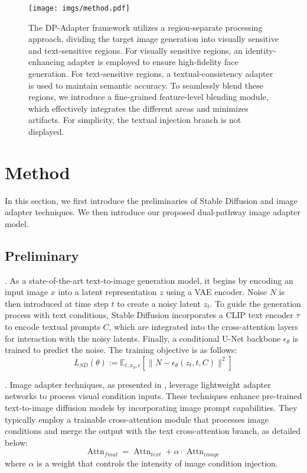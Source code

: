 \begin{figure*}[t]
    \centering
    \texttt{[image: imgs/method.pdf]}
    \caption{The DP-Adapter framework utilizes a region-separate processing approach, dividing the target image generation into visually sensitive and text-sensitive regions. For visually sensitive regions, an identity-enhancing adapter is employed to ensure high-fidelity face generation. For text-sensitive regions, a textual-consistency adapter is used to maintain semantic accuracy. To seamlessly blend these regions, we introduce a fine-grained feature-level blending module, which effectively integrates the different areas and minimizes artifacts.
    For simplicity, the textual injection branch is not displayed.}
    \label{fig:method_framework}
\end{figure*}


\section{Method}


In this section, we first introduce the preliminaries of Stable Diffusion \cite{rombach2022high} and image adapter techniques. We then introduce our proposed dual-pathway image adapter model. 
\subsection{Preliminary}

.  As a state-of-the-art text-to-image generation model, it begins by encoding an input image $x$ into a latent representation $z$ using a VAE encoder. Noise $N$ is then introduced at time step $t$ to create a noisy latent $z_t$. To guide the generation process with text conditions, Stable Diffusion \cite{rombach2022high} incorporates a CLIP text encoder $\tau$ to encode textual prompts $C$, which are integrated into the cross-attention layers for interaction with the noisy latents. Finally, a conditional U-Net backbone $\epsilon_\theta$ is trained to predict the noise. The training objective is as follows:
\begin{equation}
    L_{SD}(\theta) := \mathbb{E}_{t,x_0,\epsilon} \left[ \lVert N - \epsilon_\theta(z_t, t, C) \rVert^2 \right] \label{eq:LLDM}
\end{equation}


. 
Image adapter techniques, as presented in \citet{ye2023ip, song2024moma, mou2024t2i}, leverage lightweight adapter networks to process visual condition inputs. These techniques enhance pre-trained text-to-image diffusion models by incorporating image prompt capabilities. They typically employ a trainable cross-attention module that processes image conditions and merge the output with the text cross-attention branch, as detailed below:
\begin{equation}
\operatorname{Attn}_{final} = \operatorname{Attn}_{text} + \alpha \cdot \operatorname{Attn}_{image}
\end{equation}
where $\alpha$ is a weight that controls the intensity of image condition injection. 


